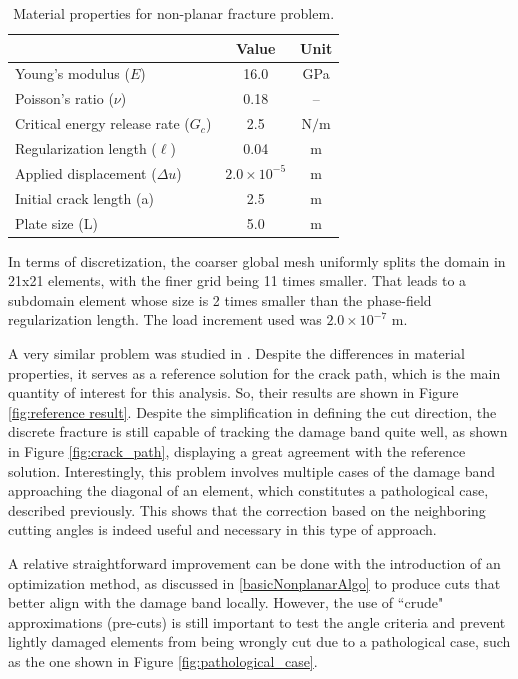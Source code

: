 \begin{table}[h]
    \centering
    \caption{Material properties for non-planar fracture problem.}
    \begin{tabular}[t]{lcc}
    \hline
    &Value &Unit \\
    \hline
    Young's modulus ($E$)&16.0&GPa\\
    Poisson's ratio ($\nu$)&0.18&--\\
    Critical energy release rate ($G_c$)&2.5&$\text{N/m}$\\
    Regularization length ($\ell$)&0.04&$\text{m}$\\
    Applied displacement ($\Delta u$)&$2.0\times 10^{-5}$&$\text{m}$\\
    Initial crack length (a)&2.5&$\text{m}$\\
    Plate size (L)&5.0&$\text{m}$\\
    \hline
    \end{tabular}
    \label{material properties nonplanar}
\end{table}%

In terms of discretization, the coarser global mesh uniformly splits the domain in 21x21 elements, with the finer grid being 11 times smaller. That leads to a subdomain element whose size is 2 times smaller than the phase-field regularization length. The load increment used was $2.0\times 10^{-7}$ m. 

A very similar problem was studied in \cite{giovanardi2017hybrid}. Despite the differences in material properties, it serves as a reference solution for the crack path, which is the main quantity of interest for this analysis. So, their results are shown in Figure \ref{fig:reference result}. Despite the simplification in defining the cut direction, the discrete fracture is still capable of tracking the damage band quite well, as shown in Figure \ref{fig:crack_path}, displaying a great agreement with the reference solution. Interestingly, this problem involves multiple cases of the damage band approaching the diagonal of an element, which constitutes a pathological case, described previously. This shows that the correction based on the neighboring cutting angles is indeed useful and necessary in this type of approach.

A relative straightforward improvement can be done with the introduction of an optimization method, as discussed in \ref{basicNonplanarAlgo} to produce cuts that better align with the damage band locally. However, the use of ``crude" approximations (pre-cuts) is still important to test the angle criteria and prevent lightly damaged elements from being wrongly cut due to a pathological case, such as the one shown in Figure \ref{fig:pathological_case}.

